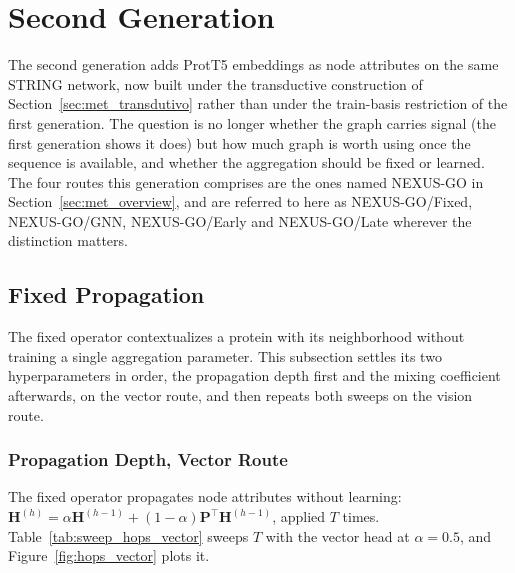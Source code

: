 \documentclass[Ingles]{ic-tese-v3}
\begin{document}
\section{Second Generation}
\label{sec:geracao2}

The second generation adds ProtT5 embeddings as node attributes on the same STRING network, now
built under the transductive construction of Section~\ref{sec:met_transdutivo} rather than under
the train-basis restriction of the first generation. The question is no longer whether the graph carries signal (the first generation
shows it does) but how much graph is worth using once the sequence is available, and
whether the aggregation should be fixed or learned. The four routes this generation
comprises are the ones named NEXUS-GO in Section~\ref{sec:met_overview}, and are referred
to here as NEXUS-GO/Fixed, NEXUS-GO/GNN, NEXUS-GO/Early and NEXUS-GO/Late wherever the
distinction matters.

\subsection{Fixed Propagation}
\label{sec:fixa}

The fixed operator contextualizes a protein with its neighborhood without training a single
aggregation parameter. This subsection settles its two hyperparameters in order, the
propagation depth first and the mixing coefficient afterwards, on the vector route, and then
repeats both sweeps on the vision route.

\subsubsection{Propagation Depth, Vector Route}
\label{sec:hops}

The fixed operator propagates node attributes without learning: $\mathbf{H}^{(h)} =
\alpha\mathbf{H}^{(h-1)} + (1-\alpha)\mathbf{P}^{\top}\mathbf{H}^{(h-1)}$, applied $T$
times. Table~\ref{tab:sweep_hops_vector} sweeps $T$ with the vector head at
$\alpha = 0.5$, and Figure~\ref{fig:hops_vector} plots it.
\end{document}
